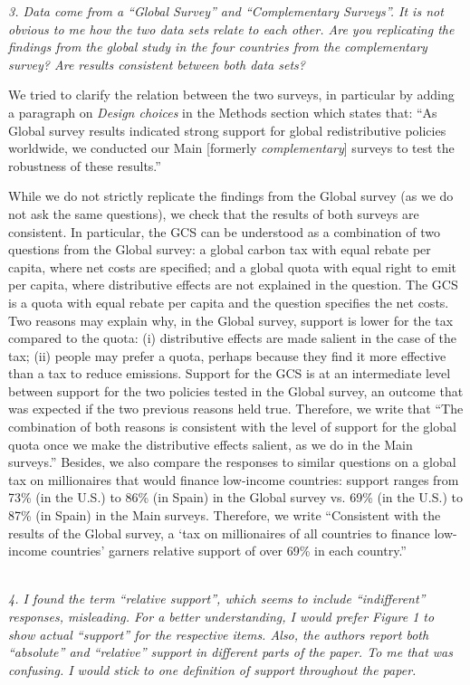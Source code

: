 \documentclass[12pt,english]{article}
\begin{document}
\textit{3. Data come from a “Global Survey” and “Complementary Surveys”. It is not obvious to me how the two data sets relate to each other. Are you replicating the findings from the global study in the four countries from the complementary survey? Are results consistent between both data sets?}

We tried to clarify the relation between the two surveys, in particular by adding a paragraph on \textit{Design choices} in the Methods section which states that: ``As Global survey results indicated strong support for global redistributive policies worldwide, we conducted our Main [formerly \textit{complementary}] surveys to test the robustness of these results.'' 

While we do not strictly replicate the findings from the Global survey (as we do not ask the same questions), we check that the results of both surveys are consistent. In particular, the GCS can be understood as a combination of two questions from the Global survey: a global carbon tax with equal rebate per capita, where net costs are specified; and a global quota with equal right to emit per capita, where distributive effects are not explained in the question. The GCS is a quota with equal rebate per capita and the question specifies the net costs. Two reasons may explain why, in the Global survey, support is lower for the tax compared to the quota: (i) distributive effects are made salient in the case of the tax; (ii) people may prefer a quota, perhaps because they find it more effective than a tax to reduce emissions. Support for the GCS is at an intermediate level between support for the two policies tested in the Global survey, an outcome that was expected if the two previous reasons held true. Therefore, we write that ``The combination of both reasons is consistent with the level of support for the global quota once we make the distributive effects salient, as we do in the Main surveys.'' Besides, we also compare the responses to similar questions on a global tax on millionaires that would finance low-income countries: support ranges from 73\% (in the U.S.) to 86\% (in Spain) in the Global survey vs. 69\% (in the U.S.) to 87\% (in Spain) in the Main surveys. Therefore, we write ``Consistent with the results of the Global survey, a `tax on millionaires of all countries to finance low-income countries' garners relative support of over 69\% in each country.''

~\\

\textit{4. I found the term “relative support”, which seems to include “indifferent” responses, misleading. For a better understanding, I would prefer Figure 1 to show actual “support” for the respective items. Also, the authors report both “absolute” and “relative” support in different parts of the paper. To me that was confusing. I would stick to one definition of support throughout the paper.}
\end{document}
